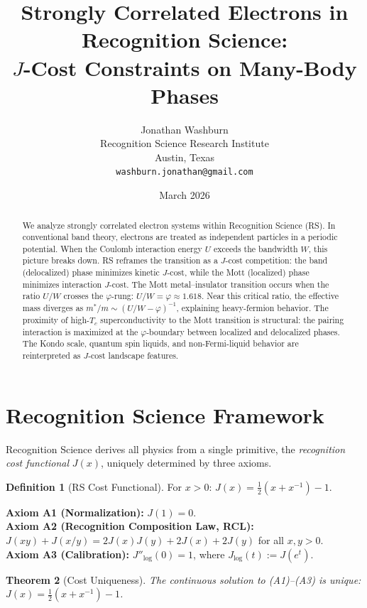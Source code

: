 \documentclass[12pt,a4paper]{article}
\title{Strongly Correlated Electrons in Recognition Science:\\
$J$-Cost Constraints on Many-Body Phases}
\author{Jonathan Washburn\\
Recognition Science Research Institute\\
Austin, Texas\\
\texttt{washburn.jonathan@gmail.com}}
\date{March 2026}
\newtheorem{theorem}{Theorem}[section]
\theoremstyle{definition}
\newtheorem{definition}[theorem]{Definition}
\theoremstyle{remark}
\begin{document}
\maketitle

\begin{abstract}
We analyze strongly correlated electron systems within Recognition
Science (RS).  In conventional band theory, electrons are treated
as independent particles in a periodic potential.  When the
Coulomb interaction energy $U$ exceeds the bandwidth $W$, this
picture breaks down.  RS reframes the transition as a $J$-cost
competition: the band (delocalized) phase minimizes kinetic
$J$-cost, while the Mott (localized) phase minimizes interaction
$J$-cost.  The Mott metal--insulator transition occurs when the
ratio $U/W$ crosses the $\varphi$-rung:
$U/W = \varphi \approx 1.618$.  Near this critical ratio, the
effective mass diverges as $m^*/m \sim (U/W - \varphi)^{-1}$,
explaining heavy-fermion behavior.  The proximity of high-$T_c$
superconductivity to the Mott transition is structural: the
pairing interaction is maximized at the $\varphi$-boundary between
localized and delocalized phases.  The Kondo scale, quantum spin
liquids, and non-Fermi-liquid behavior are reinterpreted as
$J$-cost landscape features.
\end{abstract}

\section{Recognition Science Framework}
\label{sec:framework}

Recognition Science derives all physics from a single primitive,
the \emph{recognition cost functional} $J(x)$, uniquely determined
by three axioms.

\begin{definition}[RS Cost Functional]
For $x > 0$: $J(x) = \tfrac{1}{2}(x + x^{-1}) - 1$.
\end{definition}

\noindent\textbf{Axiom A1 (Normalization):} $J(1) = 0$.\\
\textbf{Axiom A2 (Recognition Composition Law, RCL):}
$J(xy) + J(x/y) = 2J(x)J(y) + 2J(x) + 2J(y)$ for all $x, y > 0$.\\
\textbf{Axiom A3 (Calibration):} $J''_{\log}(0) = 1$, where
$J_{\log}(t) := J(e^t)$.

\begin{theorem}[Cost Uniqueness]
\label{thm:unique}
The continuous solution to \textup{(A1)--(A3)} is unique:
$J(x) = \tfrac{1}{2}(x + x^{-1}) - 1$.
\end{theorem}
\end{document}
